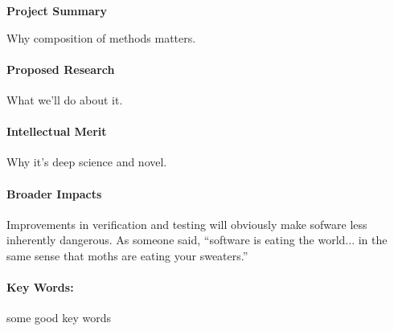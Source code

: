 \begin{center}
{\Large\sf\textbf{Project Summary\\\fulltitle{}}}
\end{center}

Why composition of methods matters.

\paragraph{Proposed Research}

What we'll do about it.


\paragraph{Intellectual Merit}

Why it's deep science and novel.

\paragraph{Broader Impacts}

Improvements in verification and testing will obviously make sofware
less inherently dangerous.  As someone said, ``software is eating the
world... in the same sense that moths are eating your sweaters.''

\paragraph{Key Words:}
some good key words


